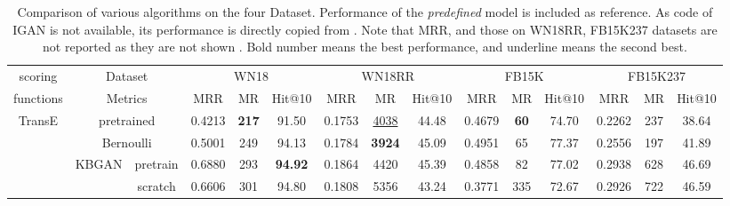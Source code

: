 \documentclass[conference]{IEEEtran}
\begin{document}
\begin{table*}[ht]
\centering
\caption{Comparison of various algorithms on the four Dataset. 
	Performance of the \textit{predefined} model is included as reference.
	As code of IGAN is not available, 
	its performance is directly copied from \cite{wang2018incorporating}.
	Note that MRR, and those on WN18RR, FB15K237 datasets are not reported as they are not shown \cite{wang2018incorporating}.
	Bold number means the best performance, and underline means the second best.}
\label{tb-perf}
\renewcommand{\arraystretch}{1.3}
\begin{tabular}{c|c c|c c c|ccc|ccc|ccc}
	\hline
	         scoring          &     \multicolumn{2}{c|}{Dataset}     &                   \multicolumn{3}{c|}{WN18}                   &                  \multicolumn{3}{c|}{WN18RR}                   &                    \multicolumn{3}{c|}{FB15K}                    &                 \multicolumn{3}{c}{FB15K237}                  \\ \cline{2-15}
	        functions         &     \multicolumn{2}{c|}{Metrics}     &        MRR         & MR              & Hit@10 &        MRR         &        MR        & Hit@10 &        MRR         &        MR         &  Hit@10 &        MRR         &       MR        & Hit@10 \\ \hline
	 \multirow{8}{*}{TransE}  &   \multicolumn{2}{c|}{pretrained}    &       0.4213       & \textbf{217}    & 91.50                  &       0.1753       & \underline{4038} &         44.48          &       0.4679       &    \textbf{60}    &          74.70          &       0.2262       &       237       &         38.64          \\
	                          &    \multicolumn{2}{c|}{Bernoulli}    &       0.5001       & 249             & 94.13                  &       0.1784       &  \textbf{3924}   &         45.09          &       0.4951       &       {65}        &         {77.37}         &       0.2556       &       197       &         41.89          \\
	                          &      KBGAN      & pretrain &       0.6880       & 293             & \textbf{94.92}         &       0.1864       &       4420       &         45.39          &       0.4858       &        82         &          77.02          &       0.2938       &       628       &         46.69          \\
	                          &                 & scratch  &       0.6606       & 301             & 94.80                  &       0.1808       &       5356       &         43.24          &       0.3771       &        335        &          72.67          &       0.2926       &       722       &         46.59          \\

\end{tabular}
\end{table*}
\end{document}

